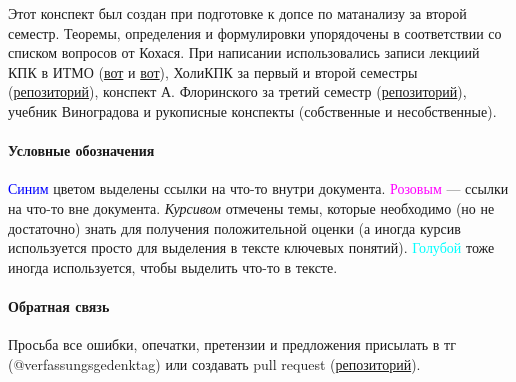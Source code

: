 
Этот конспект был создан при подготовке к допсе по матанализу за второй семестр. Теоремы, определения и формулировки упорядочены в соответствии со списком вопросов от Кохася. При написании использовались записи лекциий КПК в ИТМО (\href{https://youtube.com/playlist?list=PLd7QXkfmSY7avIqoacyLFhwAAfO-JQX7w&si=zLviQ8XKvk3Mrje3}{вот} и \href{https://youtube.com/playlist?list=PLd7QXkfmSY7YppM1nXNRKzXeQN0TYfFBQ&si=TGkLA1tfMZIdTC02}{вот}), ХолиКПК за первый и второй семестры (\href{https://github.com/snitron/ct-itmo}{репозиторий}), конспект А. Флоринского за третий семестр (\href{https://github.com/Alexandr5476/Matanaliz}{репозиторий}), учебник Виноградова и рукописные конспекты (собственные и несобственные).

\paragraph{Условные обозначения}

\textcolor{blue}{Синим} цветом выделены ссылки на что-то внутри документа. \textcolor{magenta}{Розовым} --- ссылки на что-то вне документа. \textit{Курсивом} отмечены темы, которые необходимо (но не достаточно) знать для получения положительной оценки (а иногда курсив используется просто для выделения в тексте ключевых понятий). \textcolor{cyan}{Голубой} тоже иногда используется, чтобы выделить что-то в тексте.

\paragraph{Обратная связь} Просьба все ошибки, опечатки, претензии и предложения присылать в тг (@verfassungsgedenktag) или создавать pull request (\href{https://github.com/verfassungsgedenktag/kpk}{репозиторий}).